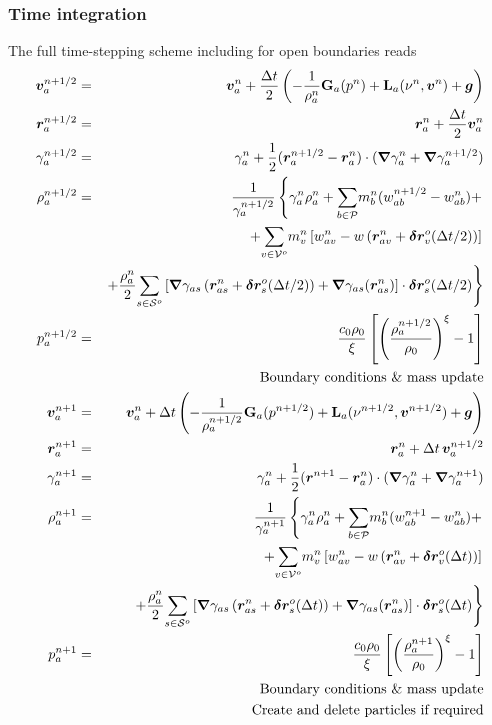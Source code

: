 \subsubsection{Time integration}
The full time-stepping scheme including for open boundaries reads
\begin{eqnarray}
\bm{v}_a^{n+1/2} &=& \bm{v}_a^n + \frac{\Delta t}{2} \left(
-\frac{1}{\rho^n_a}\textbf{G}_a(p^n) + \textbf{L}_a(\nu^n,\bm{v}^n) + \bm{g}
\right)
\label{e:open:pred-corr-ns}
\\
\bm{r}_a^{n+1/2} &=& \bm{r}_a^{n} + \frac{\Delta t}{2}
\bm{v}_a^{n}
\nonumber
\\
\gamma_a^{n+1/2} &=& \gamma_a^{n} + \frac{1}{2}
(\bm{r}_a^{n+1/2} - \bm{r}_a^{n}) \cdot (\bm{\nabla} \gamma_a^n + \bm{\nabla} \gamma_a^{n+1/2})
\nonumber
\\
\rho_a^{n+1/2} &=& \frac{1}{\gamma_a^{n+1/2}}\left\{ \gamma_a^n \rho_a^n +
\underset{b \in \mathcal{P}}{\sum} m_b^n (w_{ab}^{n+1/2} - w_{ab}^n) + \right.
\nonumber
\\
&&\left. + \underset{v\in\mathcal{V}^o}{\sum}m_v^n\left[ w_{av}^n -
w\left( \bm{r}_{av}^n + \bm{\delta r}_v^o(\Delta t/2) \right) \right]\right.
\nonumber
\\
&&\left. + \frac{\rho_a^n}{2}\underset{s\in\mathcal{S}^o}{\sum}\left[
\bm{\nabla}\gamma_{as}\left(\bm{r}_{as}^n + \bm{\delta r}_s^o(\Delta t/2)\right) +
\bm{\nabla}\gamma_{as}(\bm{r}_{as}^n)
\right]\cdot\bm{\delta r}_s^o(\Delta t/2)\right\}
\nonumber
\\
p_a^{n+1/2} &=& \frac{c_0 \rho_0}{\xi}\left[ \left( \frac{\rho_a^{n+1/2}}{\rho_0}\right)^\xi
-1 \right]
\nonumber
\\
&&\mbox{Boundary conditions \& mass update}
\nonumber
\\
\bm{v}_a^{n+1} &=& \bm{v}_a^n + \Delta t \left(
-\frac{1}{\rho^{n+1/2}_a}\textbf{G}_a(p^{n+1/2}) +
\textbf{L}_a(\nu^{n+1/2},\bm{v}^{n+1/2}) + \bm{g}
\right)
\nonumber
\\
\bm{r}_a^{n+1} &=& \bm{r}_a^{n} + \Delta t\,
\bm{v}_a^{n+1/2}
\nonumber
\\
\gamma_a^{n+1} &=& \gamma_a^{n} +\frac{1}{2}
(\bm{r}^{n+1} - \bm{r}_a^{n}) \cdot (\bm{\nabla} \gamma_a^n + \bm{\nabla} \gamma_a^{n+1})
\nonumber
\\
\rho_a^{n+1} &=& \frac{1}{\gamma_a^{n+1}}\left\{ \gamma_a^n \rho_a^n +
\underset{b \in \mathcal{P}}{\sum} m_b^n (w_{ab}^{n+1} - w_{ab}^n) + \right.
\nonumber
\\
&&\left. + \underset{v\in\mathcal{V}^o}{\sum}m_v^n\left[ w_{av}^n -
w\left( \bm{r}_{av}^n + \bm{\delta r}_v^o(\Delta t) \right) \right]\right.
\nonumber
\\
&&\left. + \frac{\rho_a^n}{2}\underset{s\in\mathcal{S}^o}{\sum}\left[
\bm{\nabla}\gamma_{as}\left(\bm{r}_{as}^n + \bm{\delta r}_s^o(\Delta t)\right) +
\bm{\nabla}\gamma_{as}(\bm{r}_{as}^n)
\right]\cdot\bm{\delta r}_s^o(\Delta t)\right\}
\nonumber
\\
p_a^{n+1} &=& \frac{c_0 \rho_0}{\xi}\left[ \left( \frac{\rho_a^{n+1}}{\rho_0}\right)^\xi
-1 \right]
\nonumber
\\
&&\mbox{Boundary conditions \& mass update}
\nonumber
\\
&&\mbox{Create and delete particles if required}
\nonumber
\end{eqnarray}


